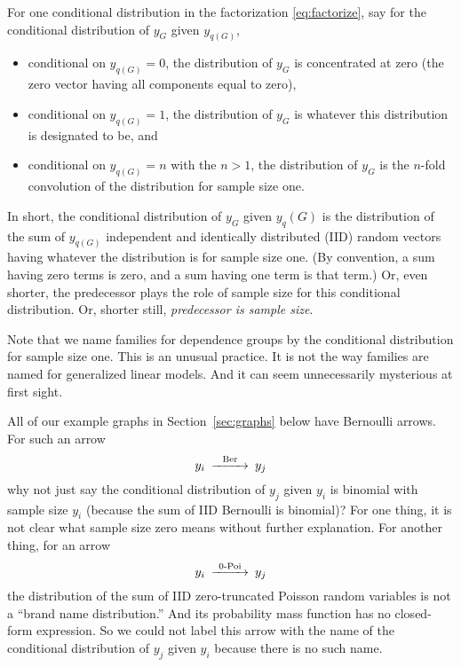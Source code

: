 For one conditional distribution in the factorization \eqref{eq:factorize},
say for the conditional distribution of $y_G$ given $y_{q(G)}$,
\begin{itemize}
\item conditional on $y_{q(G)} = 0$, the distribution of $y_G$ is concentrated
    at zero (the zero vector having all components equal to zero), 
\item conditional on $y_{q(G)} = 1$, the distribution of $y_G$ is whatever
    this distribution is designated to be, and
\item conditional on $y_{q(G)} = n$ with the $n > 1$, the distribution
    of $y_G$ is the $n$-fold convolution of the distribution for sample
    size one.
\end{itemize}
In short, the conditional distribution of $y_G$ given $y_q(G)$ is the
distribution of the sum of $y_{q(G)}$
independent and identically distributed (IID)
random vectors having whatever the distribution is for sample size one.
(By convention, a sum having zero terms is zero, and a sum having one term
is that term.)
Or, even shorter, the predecessor plays the role of sample size for this
conditional distribution.
Or, shorter still, \emph{predecessor is sample size}.

Note that we name families for dependence groups by the conditional
distribution for sample size one.
This is an unusual practice.  It is not the way families are named for
generalized linear models.
And it can seem unnecessarily mysterious at first sight.

All of our example graphs in Section~\ref{sec:graphs} below
have Bernoulli arrows.  For such an arrow
$$
\begin{CD}
   y_i @>\text{Ber}>> y_j
\end{CD}
$$
why not just say the conditional distribution of $y_j$ given $y_i$ is binomial
with sample size $y_i$ (because the sum of IID Bernoulli is binomial)?
For one thing,
it is not clear what sample size zero means without further explanation.
For another thing, for an arrow
$$
\begin{CD}
   y_i @>\text{0-Poi}>> y_j
\end{CD}
$$
the distribution of the sum of IID zero-truncated Poisson random variables
is not a ``brand name distribution.''  And its
probability mass function has no closed-form expression.
So we could not label this arrow with the name of the conditional distribution
of $y_j$ given $y_i$ because there is no such name.

